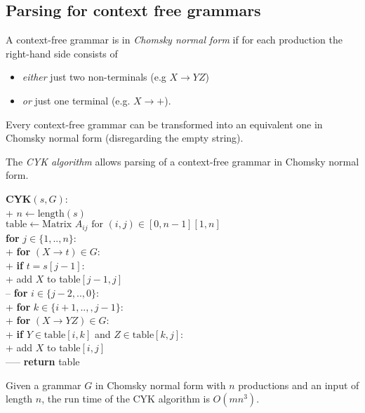 \documentclass{article}
\begin{document}
\subsection{Parsing for context free grammars}

\begin{definition}
	A context-free grammar is in \emph{Chomsky normal form} if for
	each production the right-hand side consists of
	\begin{itemize}
		\item \emph{either} just two non-terminals (e.g $X\to YZ$)
		\item \emph{or} just one terminal (e.g. $X\to +$).
	\end{itemize}
\end{definition}

\begin{lemma}
	Every context-free grammar can be transformed into an
	equivalent one in Chomsky normal form (disregarding
	the empty string).
\end{lemma}

\begin{definition}
	The \emph{CYK algorithm} allows parsing of a context-free
	grammar in Chomsky normal form.
	\begin{pseudo}
		\textbf{CYK}$(s,G)$:\\+
			$n\leftarrow\text{length}(s)$\\
			$\text{table}\leftarrow\text{Matrix }A_{ij}\text{ for }(i,j)\in[0,n-1][1,n]$\\
			\textbf{for} $j\in\{1,..,n\}$:\\+
				\textbf{for} $(X\to t)\in G$:\\+
					\textbf{if} $t=s[j-1]$:\\+
						add $X$ to table$[j-1,j]$\\--
				\textbf{for} $i\in\{j-2,..,0\}$:\\+
					\textbf{for} $k\in\{i+1,..,,j-1\}$:\\+
						\textbf{for} $(X\to YZ)\in G$:\\+
							\textbf{if} $Y\in\text{table}[i,k]$ and $Z\in\text{table}[k,j]$:\\+
								add $X$ to table$[i,j]$\\-----
            \textbf{return} table
    \end{pseudo}
\end{definition}

\begin{theorem}
	Given a grammar $G$ in Chomsky normal form with $n$ 
	productions and an input of length $n$, the run time
	of the CYK algorithm is $O(mn^3)$.
\end{theorem}
\end{document}
